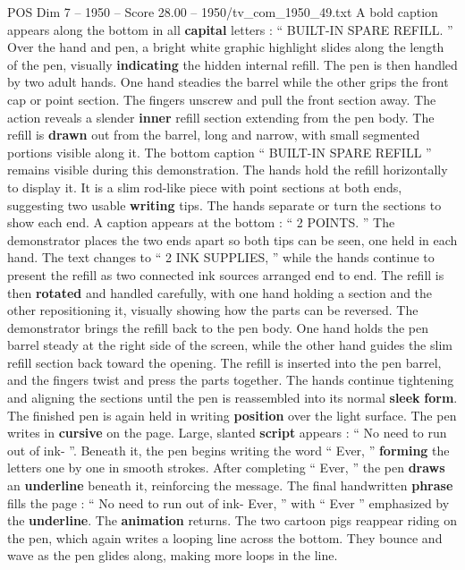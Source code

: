 \begin{textsample}{POS Dim 7 – 1950 – Score 28.00 – 1950/tv\_com\_1950\_49.txt}
A bold caption appears along the bottom in all \textbf{capital} letters : “ BUILT-IN SPARE REFILL. ” Over the hand and pen, a bright white graphic highlight slides along the length of the pen, visually \textbf{indicating} the hidden internal refill.
The pen is then handled by two adult hands.
One hand steadies the barrel while the other grips the front cap or point section.
The fingers unscrew and pull the front section away.
The action reveals a slender \textbf{inner} refill section extending from the pen body.
The refill is \textbf{drawn} out from the barrel, long and narrow, with small segmented portions visible along it.
The bottom caption “ BUILT-IN SPARE REFILL ” remains visible during this demonstration.
The hands hold the refill horizontally to display it.
It is a slim rod-like piece with point sections at both ends, suggesting two usable \textbf{writing} tips.
The hands separate or turn the sections to show each end.
A caption appears at the bottom : “ 2 POINTS. ” The demonstrator places the two ends apart so both tips can be seen, one held in each hand.
The text changes to “ 2 INK SUPPLIES, ” while the hands continue to present the refill as two connected ink sources arranged end to end.
The refill is then \textbf{rotated} and handled carefully, with one hand holding a section and the other repositioning it, visually showing how the parts can be reversed.
The demonstrator brings the refill back to the pen body.
One hand holds the pen barrel steady at the right side of the screen, while the other hand guides the slim refill section back toward the opening.
The refill is inserted into the pen barrel, and the fingers twist and press the parts together.
The hands continue tightening and aligning the sections until the pen is reassembled into its normal \textbf{sleek} \textbf{form}.
The finished pen is again held in writing \textbf{position} over the light surface.
The pen writes in \textbf{cursive} on the page.
Large, slanted \textbf{script} appears : “ No need to run out of ink- ”.
Beneath it, the pen begins writing the word “ Ever, ” \textbf{forming} the letters one by one in smooth strokes.
After completing “ Ever, ” the pen \textbf{draws} an \textbf{underline} beneath it, reinforcing the message.
The final handwritten \textbf{phrase} fills the page : “ No need to run out of ink- Ever, ” with “ Ever ” emphasized by the \textbf{underline}.
The \textbf{animation} returns.
The two cartoon pigs reappear riding on the pen, which again writes a looping line across the bottom.
They bounce and wave as the pen glides along, making more loops in the line.

\end{textsample}
